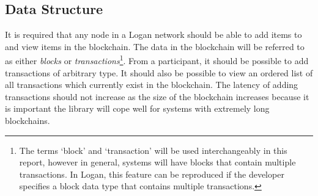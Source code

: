 \documentclass[12pt,a4paper,twoside,openright]{report}
\begin{document}
	\subsection{Data Structure}
	It is required that any node in a Logan network should be able to add items to and view items in the blockchain. 
	The data in the blockchain will be referred to as either \textit{blocks} or \textit{transactions}\footnote{The terms `block' and `transaction' will be used interchangeably in this report, however in general, systems will have blocks that contain multiple transactions. In Logan, this feature can be reproduced if the developer specifies a block data type that contains multiple transactions.}. 
	From a participant, it should be possible to add transactions of arbitrary type. 
	It should also be possible to view an ordered list of all transactions which currently exist in the blockchain.
	The latency of adding transactions should not increase as the size of the blockchain increases because it is important the library will cope well for systems with extremely long blockchains.\\
\end{document}
